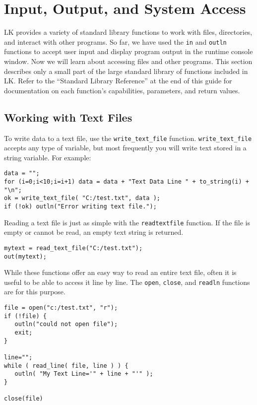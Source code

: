 \documentclass{article}
\begin{document}
\section{Input, Output, and System Access}

LK provides a variety of standard library functions to work with files, directories, and interact with other programs.  So far, we have used the \texttt{in} and \texttt{outln} functions to accept user input and display program output in the runtime console window.  Now we will learn about accessing files and other programs.  This section describes only a small part of the large standard library of functions included in LK.  Refer to the ``Standard Library Reference'' at the end of this guide for documentation on each function's capabilities, parameters, and return values.  

\subsection{Working with Text Files}

To write data to a text file, use the \texttt{write\_text\_file} function.  \texttt{write\_text\_file} accepts any type of variable, but most frequently you will write text stored in a string variable.  For example:

\begin{verbatim}
data = "";
for (i=0;i<10;i=i+1) data = data + "Text Data Line " + to_string(i) + "\n";
ok = write_text_file( "C:/test.txt", data );
if (!ok) outln("Error writing text file.");
\end{verbatim}

Reading a text file is just as simple with the \texttt{readtextfile} function.  If the file is empty or cannot be read, an empty text string is returned.

\begin{verbatim}
mytext = read_text_file("C:/test.txt");
out(mytext);
\end{verbatim}

While these functions offer an easy way to read an entire text file, often it is useful to be able to access it line by line.  The \texttt{open}, \texttt{close}, and \texttt{readln} functions are for this purpose. 

\begin{verbatim}
file = open("c:/test.txt", "r");
if (!file) {
   outln("could not open file");
   exit;
}

line="";
while ( read_line( file, line ) ) {
   outln( "My Text Line='" + line + "'" );
}

close(file)
\end{verbatim}
\end{document}

